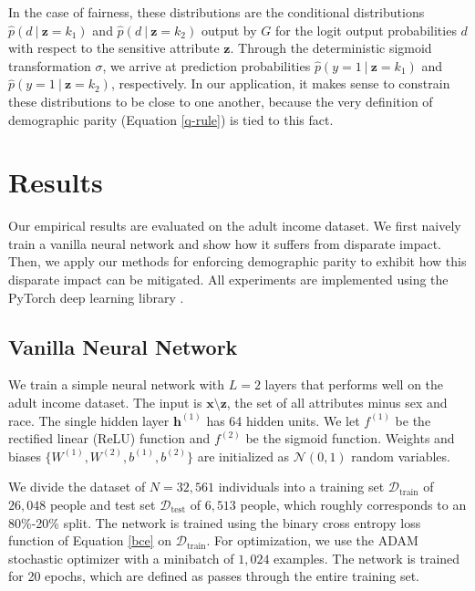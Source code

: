 \documentclass{article}
\newcommand\given[1][]{\:#1\vert\:}
\newcommand{\bd}[1]{\boldsymbol{#1}}
\newcommand{\hp}{\hat{p}}
\newcommand{\idx}[3][]{{#2}^{(#3)}_{#1}}
\newcommand{\bidx}[3][]{\bd{#2}^{(#3)}_{#1}}
\begin{document}
In the case of fairness, these distributions are the conditional distributions $\hp(d \given \bd z = k_1)$ and $\hp(d \given \bd z = k_2)$ output by $G$ for the logit output probabilities $d$ with respect to the sensitive attribute $\bd z$.  Through the deterministic sigmoid transformation $\sigma$, we arrive at prediction probabilities $\hp(y = 1 \given \bd z = k_1)$ and $\hp(y = 1 \given \bd z = k_2)$, respectively.  In our application, it makes sense to constrain these distributions to be close to one another, because the very definition of demographic parity (Equation \ref{q-rule}) is tied to this fact.          

\section{Results}
Our empirical results are evaluated on the adult income dataset.  We first naively train a vanilla neural network and show how it suffers from disparate impact.  Then, we apply our methods for enforcing demographic parity to exhibit how this disparate impact can be mitigated.  All experiments are implemented using the PyTorch deep learning library \citep{paszke2017pytorch}.  

\subsection{Vanilla Neural Network} \label{vanilla-net}

We train a simple neural network with $L = 2$ layers that performs well on the adult income dataset.  The input is $\bd x \setminus \bd z$, the set of all attributes minus sex and race.  The single hidden layer $\bidx h 1$ has 64 hidden units.  We let $\idx f 1$ be the rectified linear (ReLU) function and $\idx f 2$ be the sigmoid function.  Weights and biases $\{\idx W 1, \idx W 2, \idx b 1, \idx b 2\}$ are initialized as $\mathcal{N}(0, 1)$ random variables.  

We divide the dataset of $N = 32,561$ individuals into a training set $\mathcal{D}_\text{train}$ of $26,048$ people and test set $\mathcal{D}_\text{test}$ of $6,513$ people, which roughly corresponds to an 80\%-20\% split.  The network is trained using the binary cross entropy loss function of Equation \ref{bce} on $\mathcal{D}_\text{train}$.  For optimization, we use the ADAM stochastic optimizer \citep{kingma2014adam} with a minibatch of $1,024$ examples.  The network is trained for 20 epochs, which are defined as passes through the entire training set.   
\end{document}
